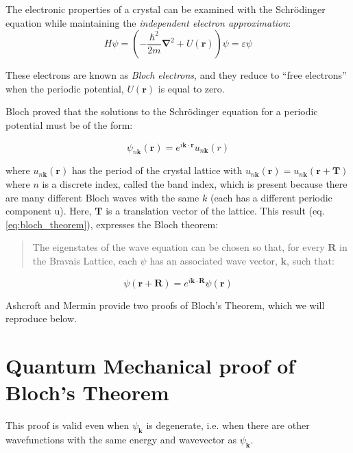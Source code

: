 	The electronic properties of a crystal can be examined with the Schrödinger equation while maintaining the \textit{independent electron approximation}:
	\begin{equation} \label{eq:schrod}
		H\psi=\left(-\frac{\hbar^2}{2m}\boldsymbol{\nabla}^2 + U(\mathbf{r})\right)\psi = \varepsilon\psi
	\end{equation}

	These electrons are known as \textit{Bloch electrons}, and they reduce to ``free electrons'' when the periodic potential, $U(\mathbf{r})$ is equal to zero.

	Bloch proved that the solutions to the Schrödinger equation for a periodic potential must be of the form:

	\begin{equation} \label{eq:bloch_theorem}
		\psi_{n\mathbf{k}}(\mathbf{r}) 
		= e^{i\mathbf{k} \cdot \mathbf{r}}
		u_{n\mathbf{k}}(r)
	\end{equation}

	where $u_{n\mathbf{k}}(\mathbf{r})$ has the period of the crystal lattice with $u_{n\mathbf{k}}(\mathbf{r}) = u_{n\mathbf{k}}(\mathbf{r} + \mathbf{T})$
	where $n$ is a discrete index, called the band index, which is present because there are many different Bloch waves with the same $k$ (each has a different periodic component u).
	Here, $\mathbf{T}$ is a translation vector of the lattice. This result (eq. \ref{eq:bloch_theorem}), expresses the Bloch theorem:
	\begin{quotation}
		The eigenstates of the wave equation can be chosen so that, for every $\mathbf{R}$ in the Bravais Lattice, each $\psi$ has an associated wave vector, $\mathbf{k}$, such that:
	\end{quotation}

	\begin{equation} \label{eq:bloch_theorem_restate}
		\psi(\mathbf{r} + \mathbf{R})
		= e^{i\mathbf{k} \cdot \mathbf{R}}
		\psi(\mathbf{r})
	\end{equation}


	Ashcroft and Mermin provide two proofs of Bloch's Theorem, which we will reproduce below.

\section{Quantum Mechanical proof of Bloch's Theorem}
	This proof is valid even when $\psi_{\mathbf{k}}$ is degenerate,  i.e. when there are other wavefunctions with the same energy and wavevector as $\psi_{\mathbf{k}}$.

